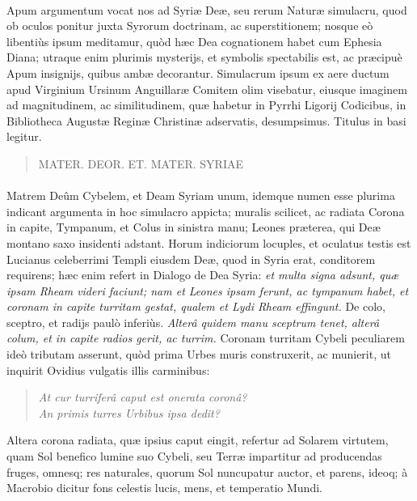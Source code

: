 \documentclass[a4paper, 11pt, oneside, polutonikogreek, latin]{article}
\begin{document}
\paragraph{}
Apum argumentum vocat nos ad Syriæ Deæ, seu rerum Naturæ simulacru, quod ob oculos ponitur juxta Syrorum doctrinam, ac superstitionem; nosque eò libentiùs ipsum meditamur, quòd hæc Dea cognationem habet cum Ephesia Diana; utraque enim plurimis mysterijs, et symbolis spectabilis est, ac præcipuè Apum insignijs, quibus ambæ decorantur. Simulacrum ipsum ex aere ductum apud Virginium Ursinum Anguillaræ Comitem olim visebatur, eiusque imaginem ad magnitudinem, ac similitudinem, quæ habetur in Pyrrhi Ligorij Codicibus, in Bibliotheca Augustæ Reginæ Christinæ adservatis, desumpsimus. Titulus in basi legitur.
\begin{quote}
MATER. DEOR. ET. MATER. SYRIAE
\end{quote}
\vspace*{-4mm}
\paragraph{}
Matrem Deûm Cybelem, et Deam Syriam unum, idemque numen esse plurima indicant argumenta in hoc simulacro appicta; muralis scilicet, ac radiata Corona in capite, Tympanum, et Colus in sinistra manu; Leones præterea, qui Deæ montano saxo insidenti adstant. Horum indiciorum locuples, et oculatus testis est Lucianus celeberrimi Templi eiusdem Deæ, quod in Syria erat, conditorem requirens; hæc enim refert in Dialogo de Dea Syria: \emph{et multa signa adsunt, quæ ipsam Rheam videri faciunt; nam et Leones ipsam ferunt, ac tympanum habet, et coronam in capite turritam gestat, qualem et Lydi Rheam effingunt.} De colo, sceptro, et radijs paulò inferiùs. \emph{Alterâ quidem manu sceptrum tenet, alterâ colum, et in capite radios gerit, ac turrim.} Coronam turritam Cybeli peculiarem ideò tributam asserunt, quòd prima Urbes muris construxerit, ac munierit, ut inquirit Ovidius vulgatis illis carminibus:
\begin{quote}
\emph{At cur turriferâ caput est onerata coronâ?}\\
\emph{An primis turres Urbibus ipsa dedit?}\\
\end{quote}
Altera corona radiata, quæ ipsius caput eingit, refertur ad Solarem virtutem, quam Sol benefico lumine suo Cybeli, seu Terræ impartitur ad producendas fruges, omnesq; res naturales, quorum Sol nuncupatur auctor, et parens, ideoq; à Macrobio dicitur fons celestis lucis, mens, et temperatio Mundi.
\end{document}
